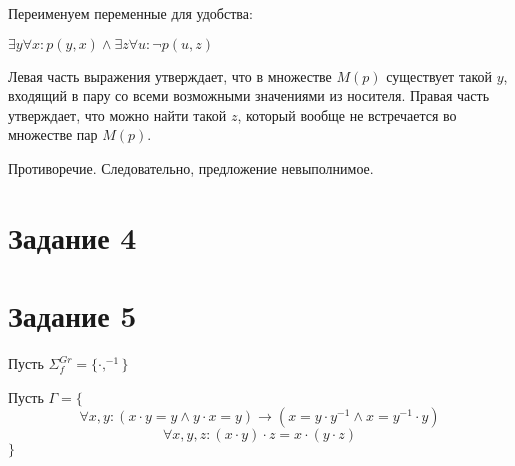\documentclass{article}
\begin{document}
\begin{enumerate}
        Переименуем переменные для удобства:

        \(\exists y \forall x : p(y, x) \land \exists z \forall u : \neg p(u, z)\)

        Левая часть выражения утверждает, что в множестве \(M(p)\) существует такой \(y\), 
        входящий в пару со всеми возможными значениями из носителя. 
        Правая часть утверждает, что можно найти такой \(z\), 
        который вообще не встречается во множестве пар \(M(p)\).

        Противоречие. Следовательно, предложение невыполнимое.
\end{enumerate}

\section*{Задание 4}
\section*{Задание 5}
Пусть \(\Sigma^{Gr}_f = \{\cdot, ^{-1}\}\)

Пусть \(\Gamma = \{\)
    \[\forall x, y : (x \cdot y = y \land y \cdot x = y) \rightarrow (x = y \cdot y^{-1} \land x = y^{-1} \cdot y)\]
    \[\forall x, y, z: (x \cdot y) \cdot z = x \cdot (y \cdot z)\]
\(\}\)
\end{document}
